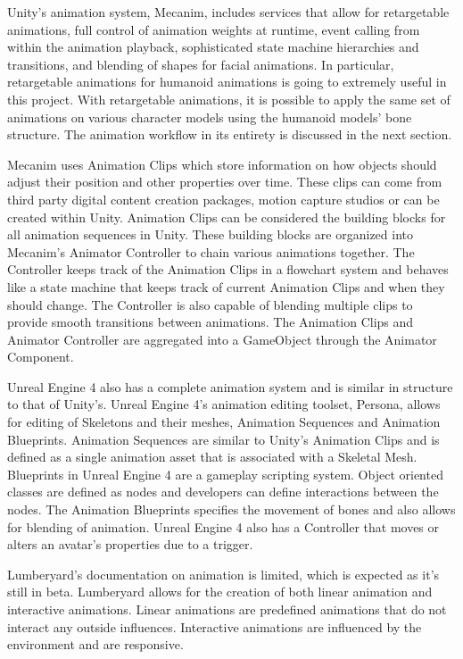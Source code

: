 \documentclass[10pt,journal,compsoc,onecolumn, draftclsnofoot]{IEEEtran}
\begin{document}
Unity's animation system, Mecanim, includes services that allow for retargetable animations, full control of animation weights at runtime, event calling from within the animation playback, sophisticated state machine hierarchies and transitions, and blending of shapes for facial animations\cite{unity_animation}. In particular, retargetable animations for humanoid animations is going to extremely useful in this project. With retargetable animations, it is possible to apply the same set of animations on various character models using the humanoid models' bone structure. The animation workflow in its entirety is discussed in the next section.

Mecanim uses Animation Clips which store information on how objects should adjust their position and other properties over time. These clips can come from third party digital content creation packages, motion capture studios or can be created within Unity. Animation Clips can be considered the building blocks for all animation sequences in Unity. These building blocks are organized into Mecanim's Animator Controller to chain various animations together. The Controller keeps track of the Animation Clips in a flowchart system and behaves like a state machine that keeps track of current Animation Clips and when they should change. The Controller is also capable of blending multiple clips to provide smooth transitions between animations. The Animation Clips and Animator Controller are aggregated into a GameObject through the Animator Component\cite{unity_animation}.

Unreal Engine 4 also has a complete animation system and is similar in structure to that of Unity's. Unreal Engine 4's animation editing toolset, Persona, allows for editing of Skeletons and their meshes, Animation Sequences and Animation Blueprints. Animation Sequences are similar to Unity's Animation Clips and is defined as a single animation asset that is associated with a Skeletal Mesh. Blueprints in Unreal Engine 4 are a gameplay scripting system. Object oriented classes are defined as nodes and developers can define interactions between the nodes\cite{unreal_animation}. The Animation Blueprints specifies the movement of bones and also allows for blending of animation. Unreal Engine 4 also has a Controller that moves or alters an avatar's properties due to a trigger.

Lumberyard's documentation on animation is limited, which is expected as it's still in beta. Lumberyard allows for the creation of both linear animation and interactive animations. Linear animations are predefined animations that do not interact any outside influences. Interactive animations are influenced by the environment and are responsive\cite{lumberyard_animation}.
\end{document}
